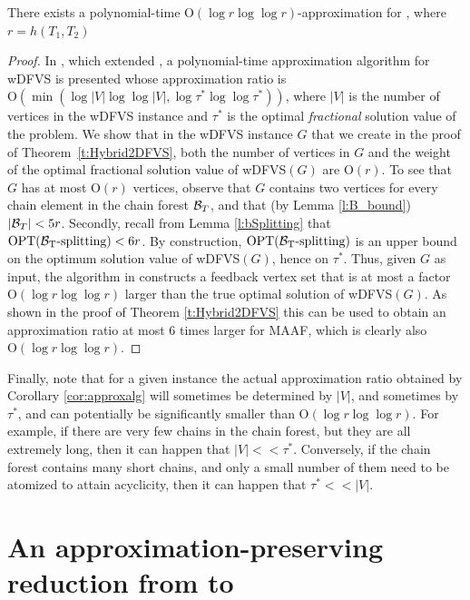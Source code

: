 \begin{corollary}
\label{cor:approxalg}
There exists a polynomial-time $\text{O}( \log r \log \log r)$-approximation for \mh, where
$r = h(T_1, T_2)$
\end{corollary}
\begin{proof}
In \cite{dfvsApprox}, which extended \cite{dfvsSeymour}, a polynomial-time approximation algorithm for wDFVS is presented whose approximation ratio is $\text{O}( \min( \log |V| \log \log |V|, \log \tau^{*} \log \log \tau^{*}) )$, where $|V|$ is the number of vertices in the wDFVS instance and $\tau^{*}$ is the optimal \emph{fractional} solution value of the problem. We show that in the wDFVS instance $G$ that we create in the proof of Theorem~\ref{t:Hybrid2DFVS},
both the number of vertices in $G$ and the weight of the optimal fractional solution value of {\sc wDFVS}$(G)$ are $\text{O}(r)$. To see that $G$ has at most $\text{O}(r)$ vertices, observe that $G$ contains two vertices for every chain element in
the chain forest ${\mathcal B}_T$, and that (by Lemma \ref{l:B_bound}) $|{\mathcal B}_T| < 5r$.
Secondly, recall from Lemma \ref{l:bSplitting} that ${\rm OPT({\mathcal B}_T\mbox{-\rm splitting})} < 6r$. By construction, ${\rm OPT({\mathcal B}_T\mbox{-\rm splitting})}$ is
an upper bound on the optimum solution value of {\sc wDFVS}$(G)$, hence on $\tau^{*}$.
Thus, given $G$ as input, the algorithm in \cite{dfvsApprox} constructs
a feedback vertex set that is at most a factor $\text{O}( \log r \log \log r)$ larger than the true
optimal solution of {\sc wDFVS}$(G)$. As shown in the proof of Theorem
\ref{t:Hybrid2DFVS} this can be used to obtain an approximation ratio at most 6 times
larger for {\sc MAAF}, which is clearly also $\text{O}( \log r \log \log r)$.
\end{proof}

\noindent
Finally, note that for a given instance the actual approximation ratio obtained by Corollary \ref{cor:approxalg} will sometimes be determined by $|V|$, and sometimes by $\tau^{*}$,
and can potentially be significantly smaller than $\text{O}( \log r \log \log r)$. For example,
if there are very few chains in the chain forest, but they are all extremely long, then it can
happen that $|V| << \tau^{*}$. Conversely, if the chain forest contains many short chains, and
only a small number of them need to be atomized to attain acyclicity, then it can happen
that $\tau^{*} << |V|$.





\section{An approximation-preserving reduction from \dfvs to \mh}\label{sec:2minhybrid}

